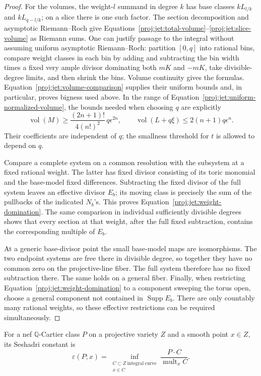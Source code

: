 \documentclass[11pt,letterpaper]{article}
\newcommand{\Q}{\mathbb{Q}}
\DeclareMathOperator{\Supp}{Supp}
\DeclareMathOperator{\mult}{mult}
\DeclareMathOperator{\vol}{vol}
\theoremstyle{definition}
\theoremstyle{remark}
\begin{document}
\begin{proof}
For the volumes, the weight-\(l\) summand in degree \(k\) has base
classes \(kL_{l/k}\) and \(kL_{q-l/k}\); on a slice there is one
such factor.  The section decomposition and asymptotic Riemann--Roch
give Equations~\eqref{proj:jet:total-volume}--\eqref{proj:jet:slice-volume}
as Riemann sums.  One can justify passage to the integral without
assuming uniform asymptotic Riemann--Roch: partition \([0,q]\) into
rational bins, compare weight classes in each bin by adding and
subtracting the bin width times a fixed very ample divisor
dominating both \(mK\) and \(-mK\), take divisible-degree limits,
and then shrink the bins.  Volume continuity gives the formulas.
Equation~\eqref{proj:jet:volume-comparison} supplies their uniform bounds
and, in particular, proves bigness used above.
In the range of Equation~\eqref{proj:jet:uniform-normalized-volume},
the bounds needed when choosing \(q\) are explicitly
\[
 \vol(M)\ge \frac{(2n+1)!}{4(n!)^2}\,q\epsilon^{2n},
 \qquad
 \vol(L+q\xi)\le2(n+1)q\epsilon^n.
\]
Their coefficients are independent of \(q\); the smallness threshold
for \(t\) is allowed to depend on \(q\).

Compare a complete system on a common resolution with the subsystem
at a fixed rational weight.  The latter has fixed divisor consisting
of its toric monomial and the base-model fixed differences.
Subtracting the fixed divisor of the full system leaves an effective
divisor \(E_b\); its moving class is precisely the sum of the
pullbacks of the indicated \(N_b\)'s.  This proves
Equation~\eqref{proj:jet:weight-domination}.  The same comparison in
individual sufficiently divisible degrees shows that every section
at that weight, after the full fixed subtraction, contains the
corresponding multiple of \(E_b\).

At a generic base-divisor point the small base-model maps are
isomorphisms.  The two endpoint systems are free there in divisible
degree, so together they have no common zero on the projective-line
fiber.  The full system therefore has no fixed subtraction there.
The same holds on a general fiber.  Finally, when restricting
Equation~\eqref{proj:jet:weight-domination} to a component sweeping the
torus open, choose a general component not contained in
\(\Supp E_b\).  There are only countably many rational weights, so
these effective restrictions can be required simultaneously.
\end{proof}

For a nef \(\Q\)-Cartier class \(P\) on a projective variety \(Z\)
and a smooth point \(x\in Z\), its Seshadri constant is
\[
 \varepsilon(P;x)=
 \inf_{\substack{C\subset Z\ \mathrm{integral\ curve}\\x\in C}}
       \frac{P\cdot C}{\mult_x C}.
\]
\end{document}
